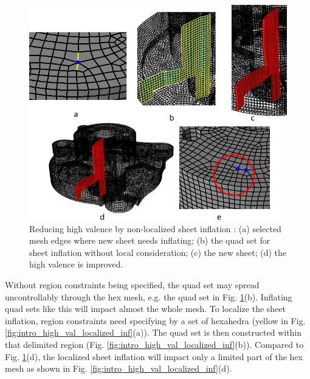 \documentclass[final,5p,times,twocolumn]{elsarticle}
\begin{document}
\begin{figure}[htbp]
\begin{center}
\includegraphics[width=12cm]{rev_figures/intro_high_val_whole.png}
\caption{Reducing high valence by non-localized sheet inflation : (a) selected mesh edges where new sheet needs inflating; (b) the quad set for sheet inflation without local consideration; (c) the new sheet; (d) the high valence is improved.}
\label{fig:intro_high_val_whole}
\end{center}
\end{figure}

Without region constraints being specified, the quad set may spread uncontrollably through the hex mesh, e.g. the quad set in Fig. \ref{fig:intro_high_val_whole}(b). Inflating quad sets like this will impact almost the whole mesh. To localize the sheet inflation, region constraints need specifying by a set of hexahedra (yellow in Fig. \ref{fig:intro_high_val_localized_inf}(a)). The quad set is then constructed within that delimited region (Fig. \ref{fig:intro_high_val_localized_inf}(b)). Compared to Fig. \ref{fig:intro_high_val_whole}(d), the localized sheet inflation will impact only a limited part of the hex mesh as shown in Fig. \ref{fig:intro_high_val_localized_inf}(d).
\end{document}
